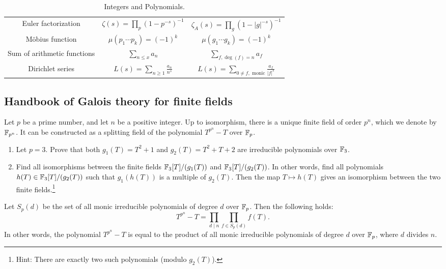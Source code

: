 \begin{table}[h]
\begin{center}
\begin{tabular}{c|c|c}
            Euler factorization & $\zeta(s) = \prod_{p} (1 - p^{-s})^{-1}$ & $\zeta_A(s) = \prod_{g} (1 - |g|^{-s})^{-1}$ \\
            M\"obius function & $\mu(p_1 \cdots p_k) = (-1)^k$ & $\mu(g_1 \cdots g_k) = (-1)^k$ \\
            Sum of arithmetic functions & $\sum_{n \le x} a_n$ & $\sum_{f, \deg(f) = n} a_f$ \\
            Dirichlet series & $L(s) = \sum_{n \ge 1} \frac{a_n}{n^s}$ & $L(s) = \sum_{0 \ne f,\text{ monic}} \frac{a_f}{|f|^s}$ \\
            \bottomrule
        \end{tabular}
        \caption{Integers and Polynomials.}
        \label{tab:dictionary}
    \end{center}
\end{table}

\newpage

\subsection{Handbook of Galois theory for finite fields}
\label{subsec:handbook_galois_ff}

\begin{theorem}
    Let $p$ be a prime number, and let $n$ be a positive integer.
    Up to isomorphism, there is a unique finite field of order $p^n$, which we denote by $\mathbb{F}_{p^n}$.
    It can be constructed as a splitting field of the polynomial $T^{p^n} - T$ over $\mathbb{F}_p$.
\end{theorem}

\begin{exercise}
    \begin{enumerate}
        \item Let $p = 3$. Prove that both $g_1(T) = T^2 + 1$ and $g_2(T) = T^2 + T + 2$ are irreducible polynomials over $\mathbb{F}_3$.
        \item Find all isomorphisms between the finite fields $\mathbb{F}_3[T] / (g_1(T))$ and $\mathbb{F}_3[T] / (g_2(T))$.
        In other words, find all polynomials $h(T) \in \mathbb{F}_3[T] / (g_2(T))$ such that $g_1(h(T))$ is a multiple of $g_2(T)$.
        Then the map $T \mapsto h(T)$ gives an isomorphism between the two finite fields.\footnote{Hint: There are exactly two such polynomials (modulo $g_2(T)$).}
    \end{enumerate}
\end{exercise}

\begin{theorem}
    Let $S_{p}(d)$ be the set of all monic irreducible polynomials of degree $d$ over $\mathbb{F}_p$.
    Then the following holds:
    \begin{equation}
        T^{p^n} - T = \prod_{d \mid n} \prod_{f \in S_p(d)} f(T).
    \end{equation}
    In other words, the polynomial $T^{p^n} - T$ is equal to the product of all monic irreducible polynomials of degree $d$ over $\mathbb{F}_p$, where $d$ divides $n$.
\end{theorem}

